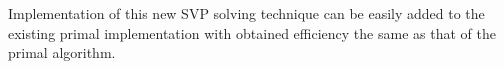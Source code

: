 \begin{comment}

\begin{algorithm}[H]
    \SetAlgoLined
    \LinesNumbered
    procedure DBKZ (\pmb{B}, k, SVP$_k$)\\
    \SetKwInOut{Input}{Input}
    \Input{A lattice basis $\pmb{B} \in \mathbb{Z}^{m\times n}$, a block size k, a SVP oracle in dimension k}
    \SetKwInOut{Output}{Output}
    \Output{A k-reduced basis $\pmb{B}'$}
    \SetKwProg{Function}{function}{}{end}
    \SetKwRepeat{Do}{do}{while}
    \While{progress is made}
    {
        Working fine
    }
    \KwRet {\pmb{B}}
    \caption{Self-Dual BKZ}
\end{algorithm}
\end{comment}


Implementation of this new SVP solving technique can be easily added to the existing primal implementation with obtained efficiency the same as that of the primal algorithm.

